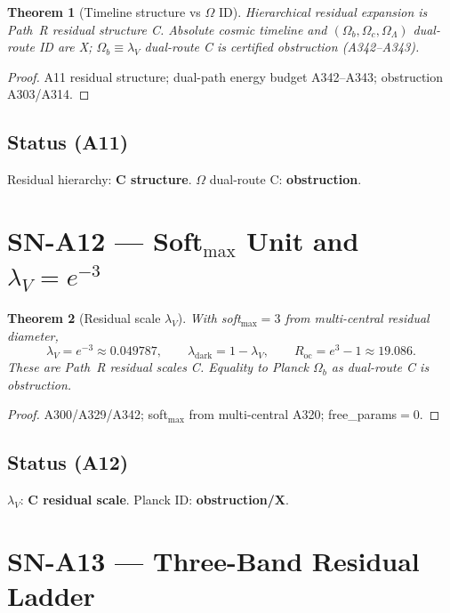 \documentclass[11pt,a4paper]{article}
\newtheorem{theorem}{Theorem}[section]
\theoremstyle{definition}
\begin{document}
\begin{theorem}[Timeline structure vs $\Omega$ ID]
\label{thm:A11}
Hierarchical residual expansion is Path~R residual structure C.
Absolute cosmic timeline and $(\Omega_b,\Omega_c,\Omega_\Lambda)$ dual-route ID are X;
$\Omega_b\equiv\lambda_V$ dual-route C is certified obstruction (A342--A343).
\end{theorem}

\begin{proof}
A11 residual structure; dual-path energy budget A342--A343; obstruction A303/A314.
\end{proof}

\subsection*{Status (A11)} Residual hierarchy: \textbf{C structure}. $\Omega$ dual-route C: \textbf{obstruction}.

\section{SN-A12 --- Soft$_{\max}$ Unit and $\lambda_V=e^{-3}$}
\label{sec:SNA12}

\begin{theorem}[Residual scale $\lambda_V$]
\label{thm:A12}
With soft$_{\max}=3$ from multi-central residual diameter,
\begin{equation}
\lambda_V=e^{-3}\approx 0.049787,\qquad
\lambda_{\mathrm{dark}}=1-\lambda_V,\qquad
R_{\mathrm{oc}}=e^{3}-1\approx 19.086.
\end{equation}
These are Path~R residual scales C. Equality to Planck $\Omega_b$ as dual-route C is obstruction.
\end{theorem}

\begin{proof}
A300/A329/A342; soft$_{\max}$ from multi-central A320; free\_params${=}0$.
\end{proof}

\subsection*{Status (A12)} $\lambda_V$: \textbf{C residual scale}. Planck ID: \textbf{obstruction/X}.

\section{SN-A13 --- Three-Band Residual Ladder}
\label{sec:SNA13}
\end{document}
